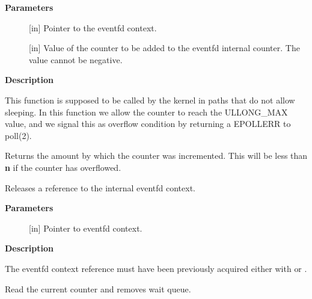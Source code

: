 \documentclass[a4paper,8pt,english]{sphinxmanual}
\begin{document}
\textbf{Parameters}
\begin{description}
\item[{}] \leavevmode
{[}in{]} Pointer to the eventfd context.

\item[{}] \leavevmode
{[}in{]} Value of the counter to be added to the eventfd internal counter.
The value cannot be negative.

\end{description}

\textbf{Description}

This function is supposed to be called by the kernel in paths that do not
allow sleeping. In this function we allow the counter to reach the ULLONG\_MAX
value, and we signal this as overflow condition by returning a EPOLLERR
to poll(2).

Returns the amount by which the counter was incremented.  This will be less
than \textbf{n} if the counter has overflowed.

\begin{fulllineitems}
\label{filesystems/index:c.eventfd_ctx_put}
Releases a reference to the internal eventfd context.

\end{fulllineitems}


\textbf{Parameters}
\begin{description}
\item[{}] \leavevmode
{[}in{]} Pointer to eventfd context.

\end{description}

\textbf{Description}

The eventfd context reference must have been previously acquired either
with {\hyperref[filesystems/index:c.eventfd_ctx_fdget]{\emph{}}} or {\hyperref[filesystems/index:c.eventfd_ctx_fileget]{\emph{}}}.

\begin{fulllineitems}
\label{filesystems/index:c.eventfd_ctx_remove_wait_queue}
Read the current counter and removes wait queue.

\end{fulllineitems}
\end{document}
